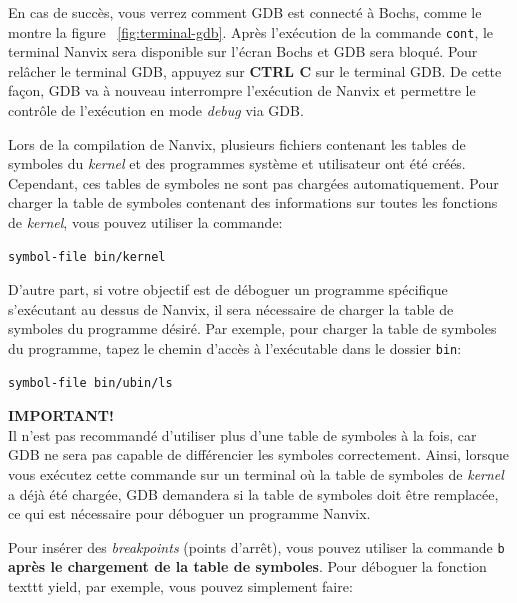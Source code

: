 \documentclass[11pt]{article}
\newcommand*{\alert}[1]{\vspace{0.4cm}\colorbox{gray!60!white}{\parbox{0.92\linewidth}{{\centering \textbf{IMPORTANT!}\\}#1}}\vspace{0.4cm}}
\begin{document}
En cas de succès, vous verrez comment GDB est connecté à Bochs, comme
le montre la figure ~\ref{fig:terminal-gdb}. Après l'exécution de la
commande \texttt {cont}, le terminal Nanvix sera disponible sur
l'écran Bochs et GDB sera bloqué. Pour relâcher le terminal GDB,
appuyez sur \textbf {CTRL C} sur le terminal GDB. De cette façon,
GDB va à nouveau interrompre l'exécution de Nanvix et permettre le
contrôle de l'exécution en mode \textit {debug} via GDB.

Lors de la compilation de Nanvix, plusieurs fichiers contenant les
tables de symboles du \textit {kernel} et des programmes système et
utilisateur ont été créés. Cependant, ces tables de symboles ne sont pas
chargées automatiquement. Pour charger la table de symboles contenant
des informations sur toutes les fonctions de \textit {kernel}, vous
pouvez utiliser la commande: \\

\begin{lstlisting}[language=sh,numbers=none,frame=single]
symbol-file bin/kernel
\end{lstlisting}

\vspace{0.3cm}
D'autre part, si votre objectif est de déboguer un
programme spécifique s'exécutant au dessus de Nanvix, il sera
nécessaire de charger la table de symboles du programme désiré. Par
exemple, pour charger la table de symboles du programme, tapez le
chemin d'accès à l'exécutable dans le dossier \texttt {bin}: \\

\begin{lstlisting}[language=sh,numbers=none,frame=single]
symbol-file bin/ubin/ls
\end{lstlisting}

\alert{Il n'est pas recommandé d'utiliser plus d'une table de symboles
  à la fois, car GDB ne sera pas capable de différencier les symboles
  correctement. Ainsi, lorsque vous exécutez cette commande sur un
  terminal où la table de symboles de \textit {kernel} a déjà été
  chargée, GDB demandera si la table de symboles doit être remplacée,
  ce qui est nécessaire pour déboguer un programme Nanvix.}

Pour insérer des \textit {breakpoints} (points d'arrêt), vous pouvez
utiliser la commande \texttt {b} \textbf {après le chargement de la
  table de symboles}.  Pour déboguer la fonction texttt {yield}, par
exemple, vous pouvez simplement faire: \\
\end{document}
